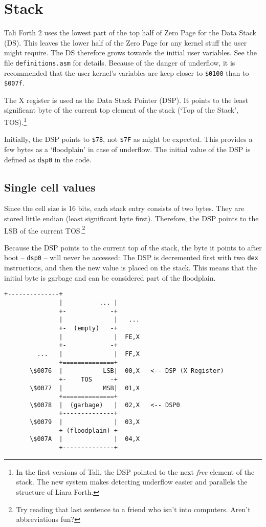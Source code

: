 
\section{Stack}

Tali Forth 2 uses the lowest part of the top half of Zero Page for the Data
Stack (DS). This leaves the lower half of the Zero Page for any kernel stuff the
user might require. The DS therefore grows towards the initial user variables.
See the file \texttt{definitions.asm} for details.  Because of the danger of
underflow, it is recommended that the user kernel's variables are keep closer to
\texttt{\$0100} than to \texttt{\$007f}.

The X register is used as the Data Stack Pointer (DSP). It points to the least
significant byte of the current top element of the stack (`Top of the Stack',
TOS).\footnote{In the first versions of Tali, the DSP pointed to the next
\textit{free} element of the stack. The new system makes detecting underflow
easier and parallels the structure of Liara Forth.}

Initially, the DSP points to \texttt{\$78}, not \texttt{\$7F} as might be
expected. This provides a few bytes as a `floodplain' in case of underflow. The
initial value of the DSP is defined as \texttt{dsp0} in the code.

\subsection{Single cell values} Since the cell size is 16 bits, each stack entry
consists of two bytes. They are stored little endian (least significant byte
first). Therefore, the DSP points to the LSB of the current TOS.\footnote{Try
reading that last sentence to a friend who isn't into computers. Aren't
abbreviations fun?}

Because the DSP points to the current top of the stack, the byte it points to
after boot -- \texttt{dsp0} -- will never be accessed: The DSP is decremented first with
two \texttt{dex} instructions, and then the new value is placed on the stack. This
means that the initial byte is garbage and can be considered part of the floodplain. 

\begin{lstlisting}[frame=single]
               +--------------+           
               |          ... |  
               +-            -+ 
               |              |   ...
               +-  (empty)   -+
               |              |  FE,X
               +-            -+ 
         ...   |              |  FF,X
               +==============+  
       \$0076  |           LSB|  00,X   <-- DSP (X Register)
               +-    TOS     -+ 
       \$0077  |           MSB|  01,X
               +==============+ 
       \$0078  |  (garbage)   |  02,X   <-- DSP0 
               +--------------+           
       \$0079  |              |  03,X
               + (floodplain) + 
       \$007A  |              |  04,X
               +--------------+           
\end{lstlisting}

